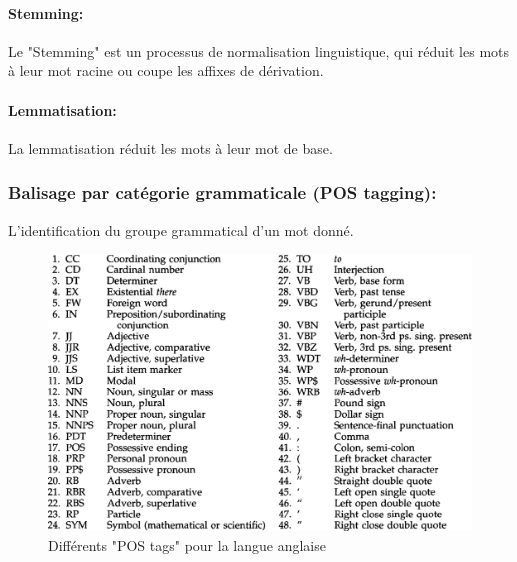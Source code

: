 \paragraph{Stemming:}
Le "Stemming" est un processus de normalisation linguistique, qui réduit les mots à leur mot racine ou coupe les affixes de dérivation.
\paragraph{Lemmatisation:}
La lemmatisation réduit les mots à leur mot de base.
\subsubsection{Balisage par catégorie grammaticale (POS tagging):}
L'identification du groupe grammatical d'un mot donné.
\begin{figure}[H]
    \centering
    \includegraphics[width=\textwidth]{chapitre3/assets/nltk-pos.png}
    \caption{Différents "POS tags" pour la langue anglaise}
    \label{fig:my_label}
\end{figure}
